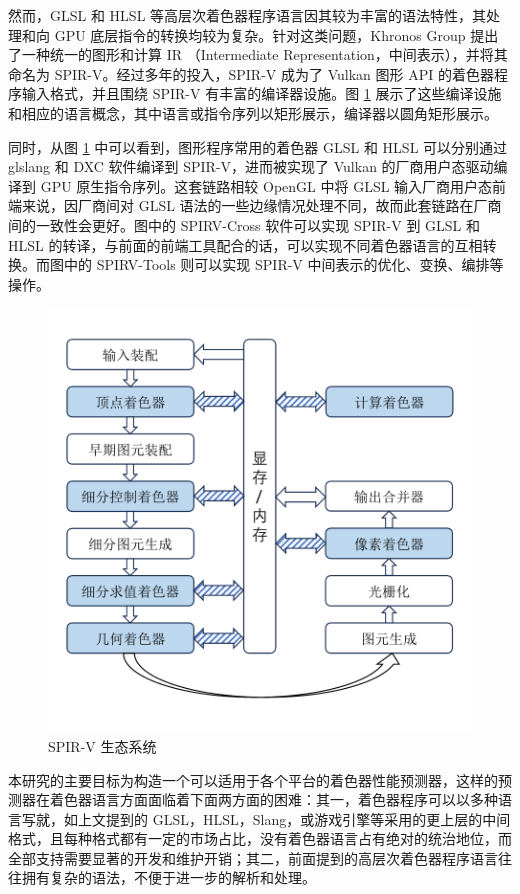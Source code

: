 然而，GLSL 和 HLSL 等高层次着色器程序语言因其较为丰富的语法特性，其处理和向 GPU 底层指令的转换均较为复杂。针对这类问题，Khronos Group 提出了一种统一的图形和计算 IR （Intermediate Representation，中间表示），并将其命名为 SPIR-V。经过多年的投入，SPIR-V 成为了 Vulkan 图形 API 的着色器程序输入格式，并且围绕 SPIR-V 有丰富的编译器设施。图 \ref{fig:spirv_ecosystem} 展示了这些编译设施和相应的语言概念，其中语言或指令序列以矩形展示，编译器以圆角矩形展示。

同时，从图 \ref{fig:spirv_ecosystem} 中可以看到，图形程序常用的着色器 GLSL 和 HLSL 可以分别通过 glslang 和 DXC 软件编译到 SPIR-V，进而被实现了 Vulkan 的厂商用户态驱动编译到 GPU 原生指令序列。这套链路相较 OpenGL 中将 GLSL 输入厂商用户态前端来说，因厂商间对 GLSL 语法的一些边缘情况处理不同，故而此套链路在厂商间的一致性会更好。图中的 SPIRV-Cross 软件可以实现 SPIR-V 到 GLSL 和 HLSL 的转译，与前面的前端工具配合的话，可以实现不同着色器语言的互相转换。而图中的 SPIRV-Tools 则可以实现 SPIR-V 中间表示的优化、变换、编排等操作。

\begin{figure}
    \centering
    \includegraphics[page=3, width=0.8\linewidth, trim=50 50 50 50, clip]{figures/pictures.pdf}
    \caption{SPIR-V 生态系统}
    \label{fig:spirv_ecosystem}
\end{figure}

本研究的主要目标为构造一个可以适用于各个平台的着色器性能预测器，这样的预测器在着色器语言方面面临着下面两方面的困难：其一，着色器程序可以以多种语言写就，如上文提到的 GLSL，HLSL，Slang，或游戏引擎等采用的更上层的中间格式，且每种格式都有一定的市场占比，没有着色器语言占有绝对的统治地位，而全部支持需要显著的开发和维护开销；其二，前面提到的高层次着色器程序语言往往拥有复杂的语法，不便于进一步的解析和处理。


